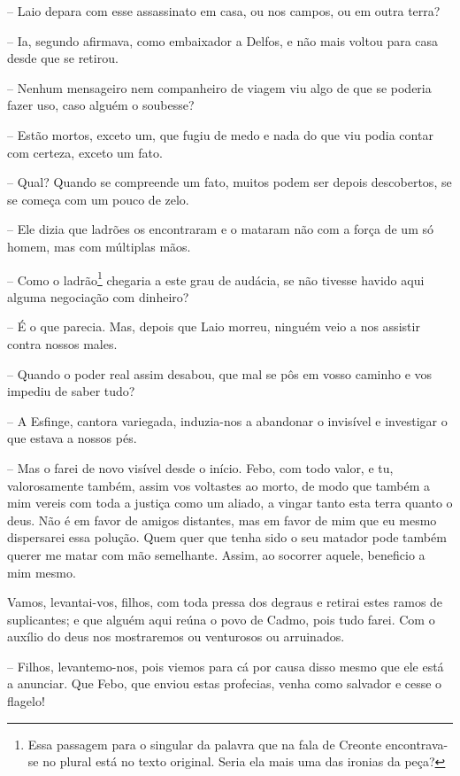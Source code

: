  --   Laio depara com esse assassinato em casa, ou nos campos, ou em outra
terra?

 --   Ia, segundo afirmava, como embaixador a Delfos, e não mais voltou para
casa desde que se retirou.

 --   Nenhum mensageiro nem companheiro de viagem viu algo de que se poderia
fazer uso, caso alguém o soubesse?

 --   Estão mortos, exceto um, que fugiu de medo e nada do que viu podia
contar com certeza, exceto um fato.

 --    Qual? Quando se compreende um fato, muitos podem ser depois
descobertos, se se começa com um pouco de zelo.

 --   Ele dizia que ladrões os encontraram e o mataram não com a força de um
só homem, mas com múltiplas mãos.

 --   Como o ladrão\footnote{Essa passagem para o singular da palavra que na
  fala de Creonte encontrava-se no plural está no texto original. Seria
  ela mais uma das ironias da peça?} chegaria a este grau de audácia, se
não tivesse havido aqui alguma negociação com dinheiro?

 --   É o que parecia. Mas, depois que Laio morreu, ninguém veio a nos
assistir contra nossos males.

 --   Quando o poder real assim desabou, que mal se pôs em vosso caminho e vos
impediu de saber tudo?

 --    A Esfinge, cantora variegada, induzia-nos a abandonar o invisível
e investigar o que estava a nossos pés.

 --   Mas o farei de novo visível desde o início. Febo, com todo valor, e tu,
valorosamente também, assim vos voltastes ao morto, de modo que também a
mim vereis com toda a justiça como um aliado, a vingar tanto esta terra
quanto o deus. Não é em favor de amigos distantes, mas em favor de mim
que eu mesmo dispersarei essa  polução. Quem quer que tenha sido o
seu matador pode também querer me matar com mão semelhante. Assim, ao
socorrer aquele, beneficio a mim mesmo.

Vamos, levantai-vos, filhos, com toda pressa dos degraus e retirai estes
ramos de suplicantes; e que alguém aqui reúna o povo de Cadmo, pois tudo
farei. Com o auxílio do deus nos mostraremos ou venturosos ou
arruinados.

 --   Filhos, levantemo-nos, pois viemos para cá por causa disso mesmo que ele
 está a anunciar. Que Febo, que enviou estas profecias, venha como
salvador e cesse o flagelo!
\bigskip

